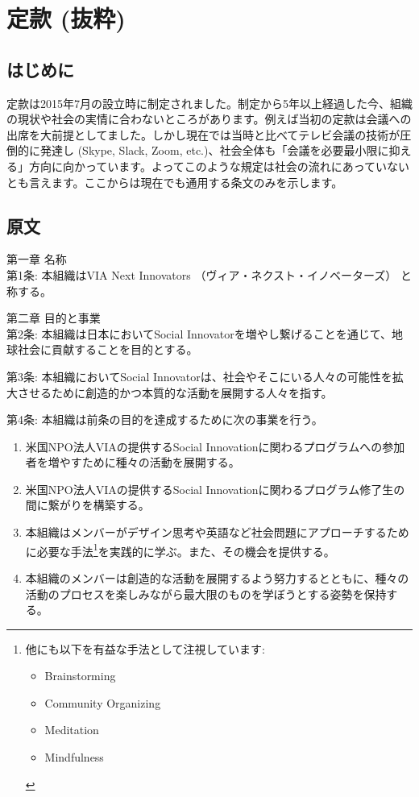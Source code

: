 \documentclass[dvipdfmx,11pt]{jsarticle}
\begin{document}
\section{定款 (抜粋)}
\subsection{はじめに}
定款は2015年7月の設立時に制定されました。制定から5年以上経過した今、組織の現状や社会の実情に合わないところがあります。例えば当初の定款は会議への出席を大前提としてました。しかし現在では当時と比べてテレビ会議の技術が圧倒的に発達し (Skype, Slack, Zoom, etc.)、社会全体も「会議を必要最小限に抑える」方向に向かっています。よってこのような規定は社会の流れにあっていないとも言えます。ここからは現在でも通用する条文のみを示します。
\subsection{原文}
第一章 名称\\
第1条: 本組織はVIA Next Innovators （ヴィア・ネクスト・イノベーターズ） と称する。
\par
第二章 目的と事業\\
第2条: 本組織は日本においてSocial Innovatorを増やし繋げることを通じて、地球社会に貢献することを目的とする。
\par
第3条: 本組織においてSocial Innovatorは、社会やそこにいる人々の可能性を拡大させるために創造的かつ本質的な活動を展開する人々を指す。
\par
第4条: 本組織は前条の目的を達成するために次の事業を行う。
\begin{enumerate}
\item 米国NPO法人VIAの提供するSocial Innovationに関わるプログラムへの参加者を増やすために種々の活動を展開する。
\item 米国NPO法人VIAの提供するSocial Innovationに関わるプログラム修了生の間に繋がりを構築する。
\item 本組織はメンバーがデザイン思考\cite{how,why,research,biz,strategy}や英語など社会問題にアプローチするために必要な手法\footnote{他にも以下を有益な手法として注視しています:
\begin{itemize}
\item Brainstorming\cite{ctb}
\item Community Organizing\cite{dev,build}
\item Meditation
\item Mindfulness\cite{art,psy,mili,search}
\end{itemize}
}を実践的に学ぶ。また、その機会を提供する。
\item 本組織のメンバーは創造的な活動を展開するよう努力するとともに、種々の活動のプロセスを楽しみながら最大限のものを学ぼうとする姿勢を保持する。
\end{enumerate}
\end{document}
